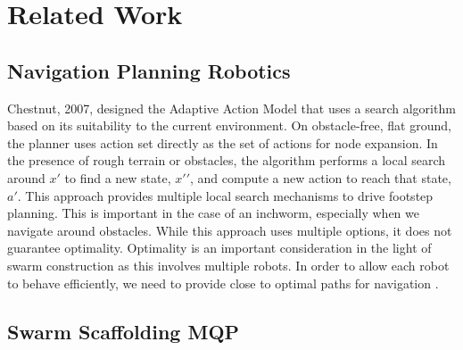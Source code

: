 \section{Related Work}

\subsection{Navigation Planning Robotics}
Chestnut, 2007, designed the Adaptive Action Model that uses a search algorithm based on its suitability to the current environment. On obstacle-free, flat ground, the planner uses action set directly as the set of actions for node expansion. In the presence of rough terrain or obstacles, the algorithm performs a local search around $x\prime$ to find a new state, $x\prime\prime$, and compute a new action to reach that state, $a\prime$. This approach provides multiple local search mechanisms to drive footstep planning. This is important in the case of an inchworm, especially when we navigate around obstacles. While this approach uses multiple options, it does not guarantee optimality. Optimality is an important consideration in the light of swarm construction as this involves multiple robots. In order to allow each robot to behave efficiently, we need to provide close to optimal paths for navigation \cite{LeggedRobotsNavPlanning}.

\subsection{Swarm Scaffolding MQP}

